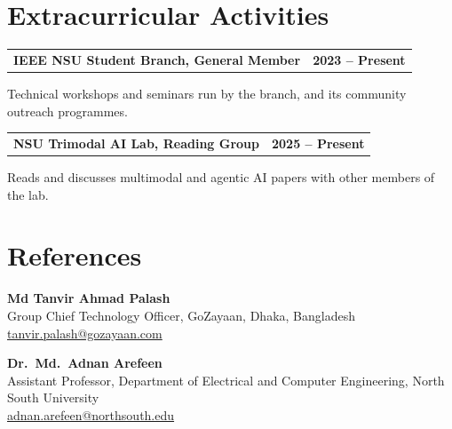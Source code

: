 \documentclass[10pt,letterpaper]{article}
\makeatletter
\newcommand{\entryhead}[2]{\par\needspace{4\baselineskip}\vspace{5pt}\noindent%
  \begin{tabular*}{\textwidth}[t]{@{}>{\raggedright\arraybackslash}p{0.75\textwidth}@{\extracolsep{\fill}}r@{}}
    \textbf{#1} & #2
  \end{tabular*}\par\vspace{1pt}}
\newcommand{\entry}[2]{\entryhead{#1}{\textbf{#2}}}
\newcommand{\gap}{\par\vspace{6pt}}
\let\origsection\section
\renewcommand{\section}[1]{\needspace{5\baselineskip}\origsection{#1}}
\makeatother
\begin{document}
\section{Extracurricular Activities}
\entry{IEEE NSU Student Branch, General Member}{2023 -- Present}
Technical workshops and seminars run by the branch, and its community outreach programmes.
\gap

\entry{NSU Trimodal AI Lab, Reading Group}{2025 -- Present}
Reads and discusses multimodal and agentic AI papers with other members of the lab.

\section{References}
\begingroup\raggedright
\noindent\textbf{Md Tanvir Ahmad Palash}\\
Group Chief Technology Officer, GoZayaan, Dhaka, Bangladesh\\
\href{mailto:tanvir.palash@gozayaan.com}{tanvir.palash@gozayaan.com}

\noindent\textbf{Dr.\ Md.\ Adnan Arefeen}\\
Assistant Professor, Department of Electrical and Computer Engineering, North South University\\
\href{mailto:adnan.arefeen@northsouth.edu}{adnan.arefeen@northsouth.edu}
\par\endgroup
\end{document}
